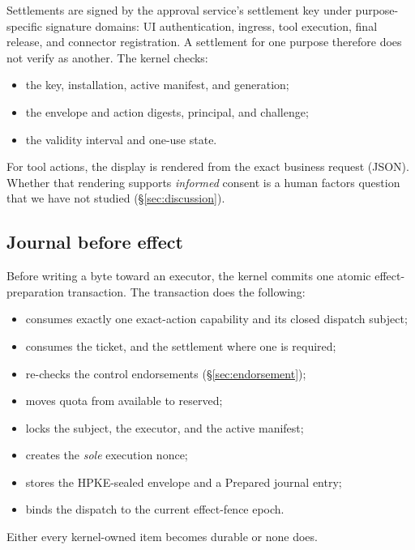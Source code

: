 \documentclass[letterpaper,twocolumn,10pt]{article}
\begin{document}
Settlements are signed by the approval service's settlement key under
purpose-specific signature domains: UI authentication, ingress, tool
execution, final release, and connector registration. A settlement for one
purpose therefore does not verify as another. The kernel checks:
\begin{itemize}
\item the key, installation, active manifest, and generation;
\item the envelope and action digests, principal, and challenge;
\item the validity interval and one-use state.
\end{itemize}
For tool actions, the display is rendered from the exact business request
(JSON). Whether that rendering supports \emph{informed} consent is a human
factors question that we have not studied (\S\ref{sec:discussion}).

\subsection{Journal before effect}
\label{sec:pipeline}

Before writing a byte toward an executor, the kernel commits one atomic
effect-preparation transaction. The transaction does the following:
\begin{itemize}
\item consumes exactly one exact-action capability and its closed dispatch
  subject;
\item consumes the ticket, and the settlement where one is required;
\item re-checks the control endorsements (\S\ref{sec:endorsement});
\item moves quota from available to reserved;
\item locks the subject, the executor, and the active manifest;
\item creates the \emph{sole} execution nonce;
\item stores the HPKE-sealed envelope and a \textsf{Prepared} journal
  entry;
\item binds the dispatch to the current effect-fence epoch.
\end{itemize}
Either every kernel-owned item becomes durable or none does.
\end{document}

